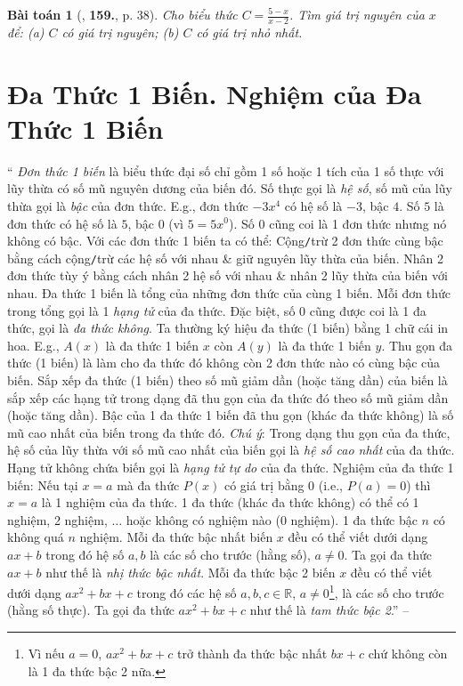 \documentclass{article}
\numberwithin{equation}{section}
\newtheorem{baitoan}{Bài toán}
\begin{document}
\begin{baitoan}[\cite{Tuyen_Toan_7}, \textbf{159.}, p. 38]
	Cho biểu thức $C = \frac{5 - x}{x - 2}$. Tìm giá trị nguyên của $x$ để: (a) $C$ có giá trị nguyên; (b) $C$ có giá trị nhỏ nhất.
\end{baitoan}


\section{Đa Thức 1 Biến. Nghiệm của Đa Thức 1 Biến}
`` \textit{Đơn thức 1 biến} là biểu thức đại số chỉ gồm 1 số hoặc 1 tích của 1 số thực với lũy thừa có số mũ nguyên dương của biến đó. Số thực gọi là \textit{hệ số}, số mũ của lũy thừa gọi là \textit{bậc} của đơn thức. E.g., đơn thức $-3x^4$ có hệ số là $-3$, bậc $4$. Số $5$ là đơn thức có hệ số là $5$, bậc $0$ (vì $5 = 5x^0$). Số $0$ cũng coi là 1 đơn thức nhưng nó không có bậc.  Với các đơn thức 1 biến ta có thể: Cộng\texttt{/}trừ 2 đơn thức cùng bậc bằng cách cộng\texttt{/}trừ các hệ số với nhau \& giữ nguyên lũy thừa của biến. Nhân 2 đơn thức tùy ý bằng cách nhân 2 hệ số với nhau \& nhân 2 lũy thừa của biến với nhau.  Đa thức 1 biến là tổng của những đơn thức của cùng 1 biến. Mỗi đơn thức trong tổng gọi là 1 \textit{hạng tử} của đa thức. Đặc biệt, số 0 cũng được coi là 1 đa thức, gọi là \textit{đa thức không}. Ta thường ký hiệu đa thức (1 biến) bằng 1 chữ cái in hoa. E.g., $A(x)$ là đa thức 1 biến $x$ còn $A(y)$ là đa thức 1 biến $y$.  Thu gọn đa thức (1 biến) là làm cho đa thức đó không còn 2 đơn thức nào có cùng bậc của biến. Sắp xếp đa thức (1 biến) theo số mũ giảm dần (hoặc tăng dần) của biến là sắp xếp các hạng tử trong dạng đã thu gọn của đa thức đó theo số mũ giảm dần (hoặc tăng dần).  Bậc của 1 đa thức 1 biến đã thu gọn (khác đa thức không) là số mũ cao nhất của biến trong đa thức đó. \textit{Chú ý}: Trong dạng thu gọn của đa thức, hệ số của lũy thừa với số mũ cao nhất của biến gọi là \textit{hệ số cao nhất} của đa thức. Hạng tử không chứa biến gọi là \textit{hạng tử tự do} của đa thức.  Nghiệm của đa thức 1 biến: Nếu tại $x = a$ mà đa thức $P(x)$ có giá trị bằng $0$ (i.e., $P(a) = 0$) thì $x = a$ là 1 nghiệm của đa thức.  1 đa thức (khác đa thức không) có thể có 1 nghiệm, 2 nghiệm, $\ldots$ hoặc không có nghiệm nào (0 nghiệm). 1 đa thức bậc $n$ có không quá $n$ nghiệm.  Mỗi đa thức bậc nhất biến $x$ đều có thể viết dưới dạng $ax + b$ trong đó hệ số $a,b$ là các số cho trước (hằng số), $a\ne0$. Ta gọi đa thức $ax + b$ như thế là \textit{nhị thức bậc nhất}. Mỗi đa thức bậc 2 biến $x$ đều có thể viết dưới dạng $ax^2 + bx + c$ trong đó các hệ số $a,b,c\in\mathbb{R}$, $a\ne 0$\footnote{Vì nếu $a = 0$, $ax^2 + bx + c$ trở thành đa thức bậc nhất $bx + c$ chứ không còn là 1 đa thức bậc 2 nữa.}, là các số cho trước (hằng số thực). Ta gọi đa thức $ax^2 + bx + c$ như thế là \textit{tam thức bậc 2}.'' -- \cite[Chap. III, \S2, p. 39]{Tuyen_Toan_7}
\end{document}
